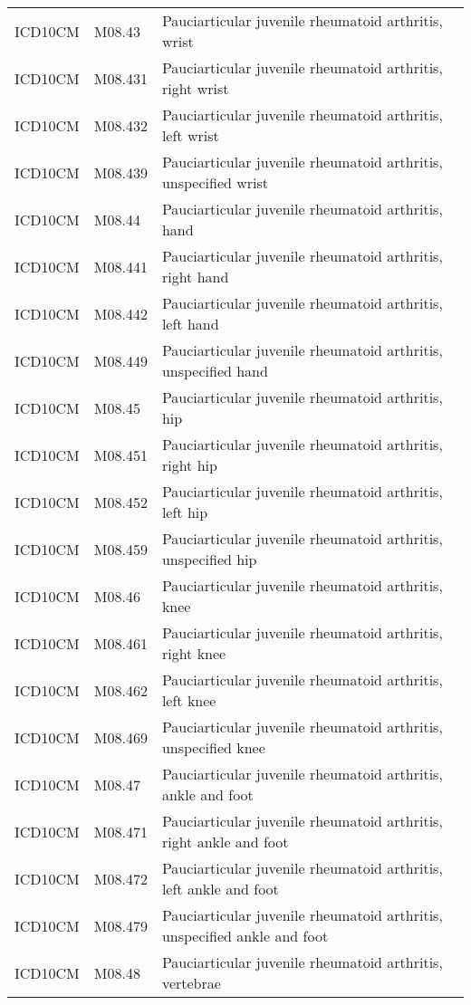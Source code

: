 \begin{longtable}{p{}p{}p{}}
  ICD10CM & M08.43 & Pauciarticular juvenile rheumatoid arthritis, wrist \\ 
  ICD10CM & M08.431 & Pauciarticular juvenile rheumatoid arthritis, right wrist \\ 
  ICD10CM & M08.432 & Pauciarticular juvenile rheumatoid arthritis, left wrist \\ 
  ICD10CM & M08.439 & Pauciarticular juvenile rheumatoid arthritis, unspecified wrist \\ 
  ICD10CM & M08.44 & Pauciarticular juvenile rheumatoid arthritis, hand \\ 
  ICD10CM & M08.441 & Pauciarticular juvenile rheumatoid arthritis, right hand \\ 
  ICD10CM & M08.442 & Pauciarticular juvenile rheumatoid arthritis, left hand \\ 
  ICD10CM & M08.449 & Pauciarticular juvenile rheumatoid arthritis, unspecified hand \\ 
  ICD10CM & M08.45 & Pauciarticular juvenile rheumatoid arthritis, hip \\ 
  ICD10CM & M08.451 & Pauciarticular juvenile rheumatoid arthritis, right hip \\ 
  ICD10CM & M08.452 & Pauciarticular juvenile rheumatoid arthritis, left hip \\ 
  ICD10CM & M08.459 & Pauciarticular juvenile rheumatoid arthritis, unspecified hip \\ 
  ICD10CM & M08.46 & Pauciarticular juvenile rheumatoid arthritis, knee \\ 
  ICD10CM & M08.461 & Pauciarticular juvenile rheumatoid arthritis, right knee \\ 
  ICD10CM & M08.462 & Pauciarticular juvenile rheumatoid arthritis, left knee \\ 
  ICD10CM & M08.469 & Pauciarticular juvenile rheumatoid arthritis, unspecified knee \\ 
  ICD10CM & M08.47 & Pauciarticular juvenile rheumatoid arthritis, ankle and foot \\ 
  ICD10CM & M08.471 & Pauciarticular juvenile rheumatoid arthritis, right ankle and foot \\ 
  ICD10CM & M08.472 & Pauciarticular juvenile rheumatoid arthritis, left ankle and foot \\ 
  ICD10CM & M08.479 & Pauciarticular juvenile rheumatoid arthritis, unspecified ankle and foot \\ 
  ICD10CM & M08.48 & Pauciarticular juvenile rheumatoid arthritis, vertebrae \\ 

\end{longtable}
